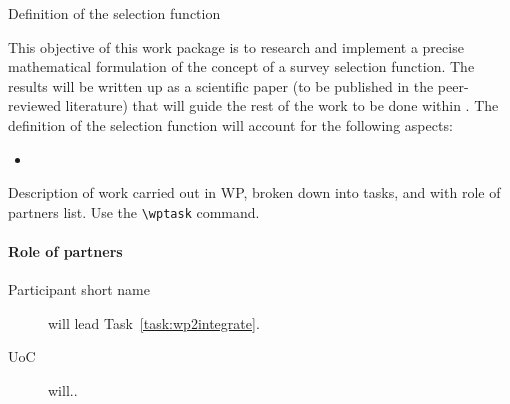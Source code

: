 \begin{workpackage}{Definition of the selection function}
  \label{wp:selfundefinition}
  
  \makewptable %

  \begin{wpobjectives}
    This objective of this work package is to research and implement a precise mathematical formulation of the concept of a survey selection function. The results will be written up as a scientific paper (to be published in the peer-reviewed literature) that will guide the rest of the work to be done within {\acro}.  The definition of the selection function will account for the following aspects:
    \begin{itemize}
        \item 
    \end{itemize}
  \end{wpobjectives}

  \begin{wpdescription}

    Description of work carried out in WP, broken down into tasks, and
    with role of partners list. Use the \texttt{\textbackslash wptask} command.


    \paragraph{Role of partners}
    \begin{description}
      \item[Participant short name] will lead Task~\ref{task:wp2integrate}.
      \item[UoC] will..
    \end{description}
  \end{wpdescription}


\end{workpackage}
